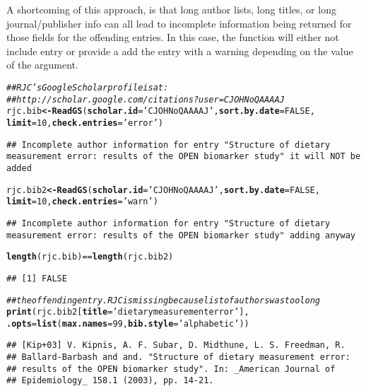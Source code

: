 \documentclass[article]{jss}\usepackage[]{graphicx}\usepackage[]{color}
\makeatletter
\newcommand{\hlnum}[1]{\textcolor[rgb]{0.125,0.125,1}{#1}}%
\newcommand{\hlstr}[1]{\textcolor[rgb]{0.125,0.125,1}{#1}}%
\newcommand{\hlcom}[1]{\textcolor[rgb]{1,0,0.753}{\textit{#1}}}%
\newcommand{\hlopt}[1]{\textcolor[rgb]{0.251,0.251,0.282}{#1}}%
\newcommand{\hlstd}[1]{\textcolor[rgb]{0.251,0.251,0.282}{#1}}%
\newcommand{\hlkwb}[1]{\textcolor[rgb]{0.439,0.251,1}{\textbf{#1}}}%
\newcommand{\hlkwc}[1]{\textcolor[rgb]{0.529,0,0.184}{\textbf{#1}}}%
\newcommand{\hlkwd}[1]{\textcolor[rgb]{0.251,0.251,0.282}{\textbf{#1}}}%
\newenvironment{kframe}{%
 \def\at@end@of@kframe{}%
 \ifinner\ifhmode%
  \def\at@end@of@kframe{\end{minipage}}%
  \begin{minipage}{\columnwidth}%
 \fi\fi%
 \def\FrameCommand##1{\hskip\@totalleftmargin \hskip-\fboxsep
 \colorbox{shadecolor}{##1}\hskip-\fboxsep
     \hskip-\linewidth \hskip-\@totalleftmargin \hskip\columnwidth}%
 \MakeFramed {\advance\hsize-\width
   \@totalleftmargin\z@ \linewidth\hsize
   \@setminipage}}%
 {\par\unskip\endMakeFramed%
 \at@end@of@kframe}
\newenvironment{knitrout}{}{} %
\makeatother
\begin{document}
A shortcoming of this approach, is that long author lists, long titles, or long journal/publisher info can all lead to incomplete information being returned for those fields for the offending entries.  In this case, the  function will either not include entry or provide a add the entry with a warning depending on the value of the  argument.
\begin{knitrout}
\color{fgcolor}\begin{kframe}
\begin{alltt}
\hlcom{## RJC's Google Scholar profile is at: }
\hlcom{## http://scholar.google.com/citations?user=CJOHNoQAAAAJ}
\hlstd{rjc.bib} \hlkwb{<-} \hlkwd{ReadGS}\hlstd{(}\hlkwc{scholar.id} \hlstd{=} \hlstr{'CJOHNoQAAAAJ'}\hlstd{,} \hlkwc{sort.by.date} \hlstd{=} \hlnum{FALSE}\hlstd{,}
                  \hlkwc{limit} \hlstd{=} \hlnum{10}\hlstd{,} \hlkwc{check.entries} \hlstd{=} \hlstr{'error'}\hlstd{)}
\end{alltt}
\begin{lstlisting}
## Incomplete author information for entry "Structure of dietary measurement error: results of the OPEN biomarker study" it will NOT be added
\end{lstlisting}\begin{alltt}
\hlstd{rjc.bib2} \hlkwb{<-} \hlkwd{ReadGS}\hlstd{(}\hlkwc{scholar.id} \hlstd{=} \hlstr{'CJOHNoQAAAAJ'}\hlstd{,} \hlkwc{sort.by.date} \hlstd{=} \hlnum{FALSE}\hlstd{,}
                  \hlkwc{limit} \hlstd{=} \hlnum{10}\hlstd{,} \hlkwc{check.entries} \hlstd{=} \hlstr{'warn'}\hlstd{)}
\end{alltt}
\begin{lstlisting}
## Incomplete author information for entry "Structure of dietary measurement error: results of the OPEN biomarker study" adding anyway
\end{lstlisting}\begin{alltt}
\hlkwd{length}\hlstd{(rjc.bib)} \hlopt{==} \hlkwd{length}\hlstd{(rjc.bib2)}
\end{alltt}
\begin{verbatim}
## [1] FALSE
\end{verbatim}
\begin{alltt}
\hlcom{## the offending entry.  RJC is missing because list of authors was too long}
\hlkwd{print}\hlstd{(rjc.bib2[}\hlkwc{title}\hlstd{=}\hlstr{'dietary measurement error'}\hlstd{],}
      \hlkwc{.opts} \hlstd{=} \hlkwd{list}\hlstd{(}\hlkwc{max.names} \hlstd{=} \hlnum{99}\hlstd{,} \hlkwc{bib.style} \hlstd{=} \hlstr{'alphabetic'}\hlstd{))}
\end{alltt}
\begin{verbatim}
## [Kip+03] V. Kipnis, A. F. Subar, D. Midthune, L. S. Freedman, R.
## Ballard-Barbash and and. "Structure of dietary measurement error:
## results of the OPEN biomarker study". In: _American Journal of
## Epidemiology_ 158.1 (2003), pp. 14-21.
\end{verbatim}
\end{kframe}
\end{knitrout}
\end{document}
